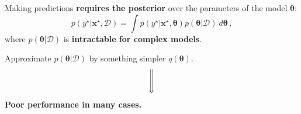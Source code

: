 \documentclass[aspectratio=149]{beamer}
\begin{document}
    \begin{frame}
        Making predictions \textbf{requires the posterior} over the parameters of the model \(\bm{\theta}\):
        \[
            p(y^\star | \mathbf{x}^\star, \mathcal{D}) = \int p(y^\star | \mathbf{x}^\star, \bm{\theta}) p(\bm{\theta} | \mathcal{D}) \ d\bm{\theta}\,,
        \]
        where \( p(\bm{\theta} | \mathcal{D}) \) is \textbf{intractable for complex models}.
    \end{frame}


    \begin{frame}
        \begin{center}
            Approximate  \( p(\bm{\theta} | \mathcal{D}) \) by something simpler \(q(\bm{\theta})\).
            {
                \[
                    \Bigg\Downarrow
                \]
                \textbf{Poor performance in many cases.}
            }
        \end{center}
    \end{frame}
\end{document}
